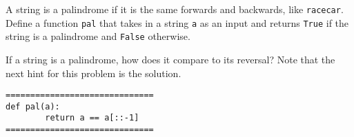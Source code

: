 \documentclass{ximera}
\begin{document}
\begin{question}
A string is a palindrome if it is the same forwards and backwards, like \verb|racecar|. Define a function \verb|pal| that takes in a string \verb|a| as an input and returns \verb|True| if the string is a palindrome and \verb|False| otherwise.
	\begin{hint}
	If a string is a palindrome, how does it compare to its reversal? Note that the next hint for this problem is the solution.
	\end{hint}
	\begin{hint}
\begin{verbatim}
==============================
def pal(a):
        return a == a[::-1]
==============================
\end{verbatim}
	\end{hint}
\end{question}
\end{document}

